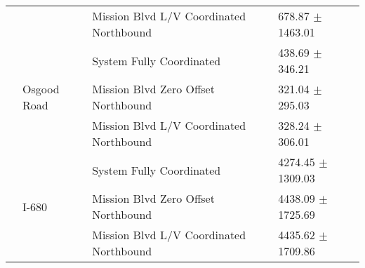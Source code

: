 \begin{tabular}{llll}
 &  & Mission Blvd L/V Coordinated Northbound & 678.87 $\pm$ 1463.01 \\
 & \multirow[t]{3}{*}{Osgood Road} & System Fully Coordinated & 438.69 $\pm$ 346.21 \\
 &  & Mission Blvd Zero Offset Northbound & 321.04 $\pm$ 295.03 \\
 &  & Mission Blvd L/V Coordinated Northbound & 328.24 $\pm$ 306.01 \\
 & \multirow[t]{3}{*}{I-680} & System Fully Coordinated & 4274.45 $\pm$ 1309.03 \\
 &  & Mission Blvd Zero Offset Northbound & 4438.09 $\pm$ 1725.69 \\
 &  & Mission Blvd L/V Coordinated Northbound & 4435.62 $\pm$ 1709.86 \\
\bottomrule
\end{tabular}
